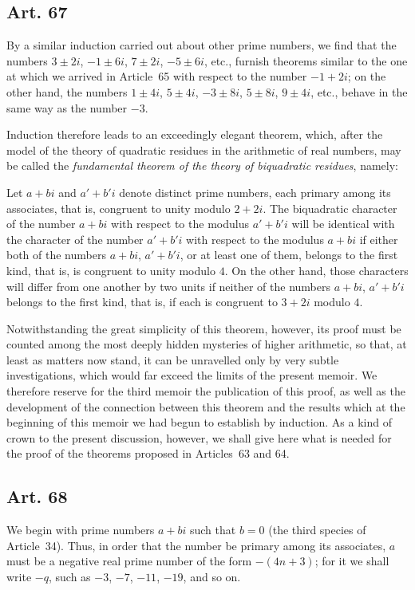 \documentclass[12pt]{article}
\newcommand{\art}[1]{\subsection*{Art. #1}}
\begin{document}
\art{67}
By a similar induction carried out about other prime numbers, we find that the numbers $3\pm2i$, $-1\pm6i$, $7\pm2i$, $-5\pm6i$, etc., furnish theorems similar to the one at which we arrived in Article~65 with respect to the number $-1+2i$; on the other hand, the numbers $1\pm4i$, $5\pm4i$, $-3\pm8i$, $5\pm8i$, $9\pm4i$, etc., behave in the same way as the number $-3$.

Induction therefore leads to an exceedingly elegant theorem, which, after the model of the theory of quadratic residues in the arithmetic of real numbers, may be called the \textit{fundamental theorem of the theory of biquadratic residues}, namely:

Let $a+bi$ and $a'+b'i$ denote distinct prime numbers, each primary among its associates, that is, congruent to unity modulo $2+2i$. The biquadratic character of the number $a+bi$ with respect to the modulus $a'+b'i$ will be identical with the character of the number $a'+b'i$ with respect to the modulus $a+bi$ if either both of the numbers $a+bi$, $a'+b'i$, or at least one of them, belongs to the first kind, that is, is congruent to unity modulo $4$. On the other hand, those characters will differ from one another by two units if neither of the numbers $a+bi$, $a'+b'i$ belongs to the first kind, that is, if each is congruent to $3+2i$ modulo $4$.

Notwithstanding the great simplicity of this theorem, however, its proof must be counted among the most deeply hidden mysteries of higher arithmetic, so that, at least as matters now stand, it can be unravelled only by very subtle investigations, which would far exceed the limits of the present memoir. We therefore reserve for the third memoir the publication of this proof, as well as the development of the connection between this theorem and the results which at the beginning of this memoir we had begun to establish by induction. As a kind of crown to the present discussion, however, we shall give here what is needed for the proof of the theorems proposed in Articles~63 and 64.

\art{68}
We begin with prime numbers $a+bi$ such that $b=0$ (the third species of Article~34). Thus, in order that the number be primary among its associates, $a$ must be a negative real prime number of the form $-(4n+3)$; for it we shall write $-q$, such as $-3$, $-7$, $-11$, $-19$, and so on.
\end{document}
